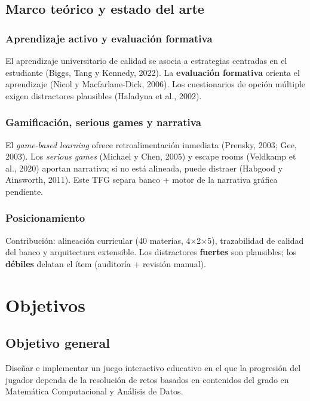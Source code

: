 \documentclass[11pt,a4paper]{article}
\begin{document}
\subsection{Marco teórico y estado del arte}

\subsubsection{Aprendizaje activo y evaluación formativa}

El aprendizaje universitario de calidad se asocia a estrategias centradas en el estudiante (Biggs, Tang y Kennedy, 2022). La \textbf{evaluación formativa} orienta el aprendizaje (Nicol y Macfarlane-Dick, 2006). Los cuestionarios de opción múltiple exigen distractores plausibles (Haladyna et al., 2002).

\subsubsection{Gamificación, serious games y narrativa}

El \textit{game-based learning} ofrece retroalimentación inmediata (Prensky, 2003; Gee, 2003). Los \textit{serious games} (Michael y Chen, 2005) y escape rooms (Veldkamp et al., 2020) aportan narrativa; si no está alineada, puede distraer (Habgood y Ainsworth, 2011). Este TFG separa banco + motor de la narrativa gráfica pendiente.

\subsubsection{Posicionamiento}

Contribución: alineación curricular (40 materias, 4×2×5), trazabilidad de calidad del banco y arquitectura extensible. Los distractores \textbf{fuertes} son plausibles; los \textbf{débiles} delatan el ítem (auditoría + revisión manual).

\section{Objetivos}

\subsection{Objetivo general}

Diseñar e implementar un juego interactivo educativo en el que la progresión del jugador dependa de la resolución de retos basados en contenidos del grado en Matemática Computacional y Análisis de Datos.
\end{document}
